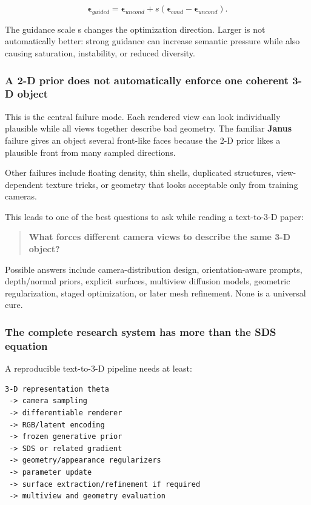 \[\boldsymbol\epsilon_{guided}=\boldsymbol\epsilon_{uncond}+s(\boldsymbol\epsilon_{cond}-\boldsymbol\epsilon_{uncond}).\]

The guidance scale s changes the optimization direction. Larger is not automatically better: strong guidance can increase semantic pressure while also causing saturation, instability, or reduced diversity.

\subsubsection{A 2-D prior does not automatically enforce one coherent 3-D object}\label{04-visual-computing-ii-ch035-a-2-d-prior-does-not-automatically-enforce-one-coherent-3-d-object}

This is the central failure mode. Each rendered view can look individually plausible while all views together describe bad geometry. The familiar \textbf{Janus} failure gives an object several front-like faces because the 2-D prior likes a plausible front from many sampled directions.

Other failures include floating density, thin shells, duplicated structures, view-dependent texture tricks, or geometry that looks acceptable only from training cameras.

This leads to one of the best questions to ask while reading a text-to-3-D paper:

\begin{quote}
\textbf{What forces different camera views to describe the same 3-D object?}
\end{quote}

Possible answers include camera-distribution design, orientation-aware prompts, depth/normal priors, explicit surfaces, multiview diffusion models, geometric regularization, staged optimization, or later mesh refinement. None is a universal cure.

\subsubsection{The complete research system has more than the SDS equation}\label{04-visual-computing-ii-ch035-the-complete-research-system-has-more-than-the-sds-equation}

A reproducible text-to-3-D pipeline needs at least:

\begin{verbatim}
3-D representation theta
 -> camera sampling
 -> differentiable renderer
 -> RGB/latent encoding
 -> frozen generative prior
 -> SDS or related gradient
 -> geometry/appearance regularizers
 -> parameter update
 -> surface extraction/refinement if required
 -> multiview and geometry evaluation
\end{verbatim}

